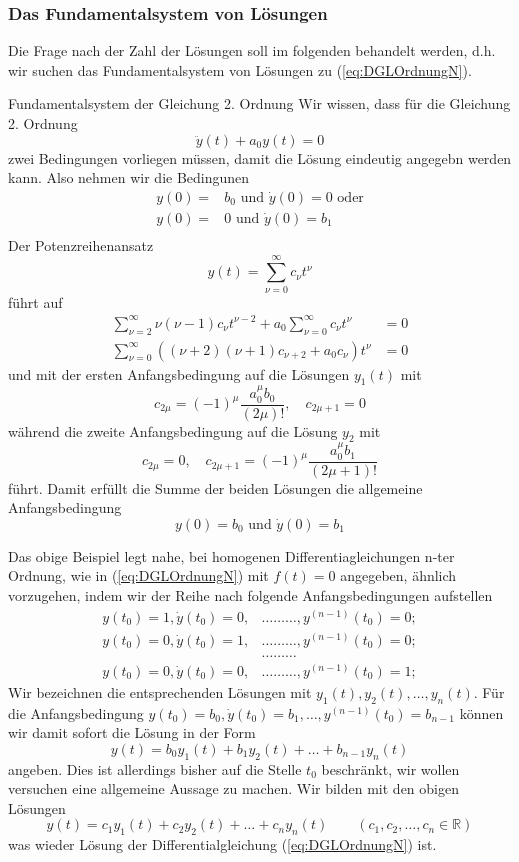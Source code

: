 \subsubsection{Das Fundamentalsystem von Lösungen}
Die Frage nach der Zahl der Lösungen soll im folgenden behandelt werden, d.h.
wir suchen das Fundamentalsystem von Lösungen zu (\ref{eq:DGLOrdnungN}).
\begin{example}{Fundamentalsystem der Gleichung 2. Ordnung}
  Wir wissen, dass für die Gleichung 2. Ordnung 
  \[\ddot{y}(t)+a_0y(t)=0 \]
  zwei Bedingungen vorliegen müssen, damit die Lösung eindeutig angegebn werden
  kann. Also nehmen wir die Bedingunen
  \begin{align}
  y(0)=&b_0\mbox{ und }\dot{y}(0)=0\mbox{ oder}\nonumber\\
  y(0)=&0\mbox{ und }\dot{y}(0)=b_1\nonumber\\
  \end{align}
  Der Potenzreihenansatz
  \[ y(t)=\sum\limits_{\nu=0}^\infty c_\nu t^\nu \]
  führt auf
  \begin{align*}
  \sum\limits_{\nu=2}^\infty\nu(\nu-1)c_\nu t^{\nu-2}+a_0\sum\limits_{\nu=0}^\infty c_\nu t^\nu &=0\\
  \sum\limits_{\nu=0}^\infty\left( (\nu+2)(\nu+1)c_{\nu+2} +a_0c_\nu\right) t^\nu &=0
  \end{align*}
  und mit der ersten Anfangsbedingung auf die Lösungen $y_1(t)$ mit
  \[ c_{2\mu}=(-1)^\mu\frac{a_0^\mu b_0}{(2\mu)!},\quad c_{2\mu+1}=0\]
  während die zweite Anfangsbedingung auf die Lösung $y_2$ mit
  \[ c_{2\mu}=0, \quad c_{2\mu+1}=(-1)^\mu\frac{a_0^\mu b_1}{(2\mu+1)!}\]
  führt. Damit erfüllt die Summe der beiden Lösungen die allgemeine
  Anfangsbedingung
  \[ y(0)=b_0\mbox{ und }\dot{y}(0)=b_1\]
\end{example}
Das obige Beispiel legt nahe, bei homogenen Differentiagleichungen n-ter
Ordnung, wie in (\ref{eq:DGLOrdnungN}) mit $f(t)=0$ angegeben, ähnlich
vorzugehen, indem wir der Reihe nach folgende Anfangsbedingungen aufstellen
\begin{align*}
  y(t_0)=1,\dot{y}(t_0)=0,&\dots\dots\dots,y^{(n-1)}(t_0)=0;\\
  y(t_0)=0,\dot{y}(t_0)=1,&\dots\dots\dots,y^{(n-1)}(t_0)=0;\\
  &\dots\dots\dots \\
  y(t_0)=0,\dot{y}(t_0)=0,&\dots\dots\dots,y^{(n-1)}(t_0)=1;
  \label{eq:NICs}
\end{align*}
Wir bezeichnen die entsprechenden Lösungen mit $y_1(t),y_2(t),\dots,y_n(t)$.
Für die Anfangsbedingung
$y(t_0)=b_0,\dot{y}(t_0)=b_1,\dots,y^{(n-1)}(t_0)=b_{n-1}$ können wir damit
sofort die Lösung in der Form
\begin{equation}
  y(t)=b_0y_1(t)+b_1y_2(t)+\dots+b_{n-1}y_n(t)
  \label{eq:FundamentalSuperpose}
\end{equation}
angeben. Dies ist allerdings bisher auf die Stelle $t_0$ beschränkt, wir wollen
versuchen eine allgemeine Aussage zu machen. Wir bilden mit den obigen Lösungen 
\[y(t)=c_1y_1(t)+c_2y_2(t)+\dots+c_ny_n(t)\qquad (c_1,c_2,\dots,c_n\in\mathbb{R})\]
was wieder Lösung der Differentialgleichung (\ref{eq:DGLOrdnungN}) ist.

